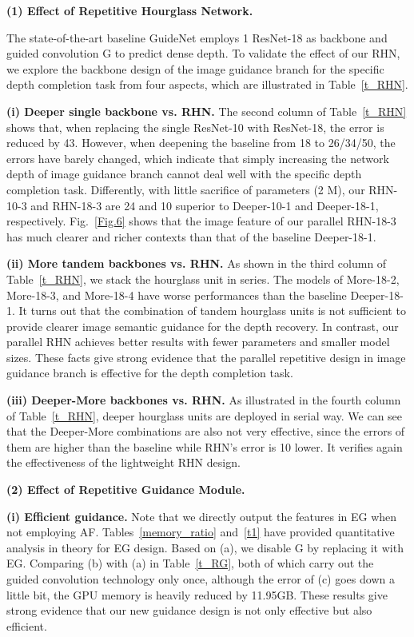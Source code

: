 \documentclass[runningheads]{llncs}
\begin{document}
\noindent \textbf{(1) Effect of Repetitive Hourglass Network.}

The state-of-the-art baseline GuideNet \cite{tang2020learning} employs 1 ResNet-18 as backbone and guided convolution G to predict dense depth. To validate the effect of our RHN, we explore the backbone design of the image guidance branch for the specific depth completion task from four aspects, which are illustrated in Table~\ref{t_RHN}.

\textbf{(i) Deeper single backbone vs. RHN.} The second column of Table~\ref{t_RHN} shows that, when replacing the single ResNet-10 with ResNet-18, the error is reduced by 43. However, when deepening the baseline from 18 to 26/34/50, the errors have barely changed, which indicate that simply increasing the network depth of image guidance branch cannot deal well with the specific depth completion task. Differently, with little sacrifice of parameters (2 M), our RHN-10-3 and RHN-18-3 are 24 and 10 superior to Deeper-10-1 and Deeper-18-1, respectively. Fig.~\ref{Fig.6} shows that the image feature of our parallel RHN-18-3 has much clearer and richer contexts than that of the baseline Deeper-18-1.

\textbf{(ii) More tandem backbones vs. RHN.} As shown in the third column of Table~\ref{t_RHN}, we stack the hourglass unit in series. The models of More-18-2, More-18-3, and More-18-4 have worse performances than the baseline Deeper-18-1. It turns out that the combination of tandem hourglass units is not sufficient to provide clearer image semantic guidance for the depth recovery. In contrast, our parallel RHN achieves better results with fewer parameters and smaller model sizes. These facts give strong evidence that the parallel repetitive design in image guidance branch is effective for the depth completion task.

\textbf{(iii) Deeper-More backbones vs. RHN.} As illustrated in the fourth column of Table~\ref{t_RHN}, deeper hourglass units are deployed in serial way. We can see that the Deeper-More combinations are also not very effective, since the errors of them are higher than the baseline while RHN's error is 10 lower. It verifies again the effectiveness of the lightweight RHN design. 

\noindent \textbf{(2) Effect of Repetitive Guidance Module.}

\textbf{(i) Efficient guidance.} Note that we directly output the features in EG when not employing AF. Tables~\ref{memory_ratio} and~\ref{t1} have provided quantitative analysis in theory for EG design. Based on (a), we disable G by replacing it with EG. Comparing (b) with (a) in Table~\ref{t_RG}, both of which carry out the guided convolution technology only once, although the error of (c) goes down a little bit, the GPU memory is heavily reduced by 11.95GB. These results give strong evidence that our new guidance design is not only effective but also efficient.
\end{document}
